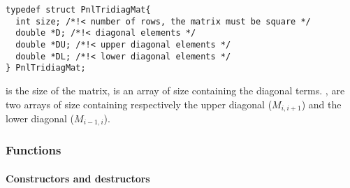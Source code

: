 \begin{verbatim}
typedef struct PnlTridiagMat{
  int size; /*!< number of rows, the matrix must be square */
  double *D; /*!< diagonal elements */
  double *DU; /*!< upper diagonal elements */
  double *DL; /*!< lower diagonal elements */
} PnlTridiagMat;
\end{verbatim}

 is the size of the matrix,  is an array of size 
containing the diagonal terms. ,
 are two arrays of size  containing respectively the upper
diagonal ($M_{i, i+1}$) and the lower diagonal ($M_{i-1, i}$). 
\subsubsection{Functions}
\paragraph{Constructors and destructors}
